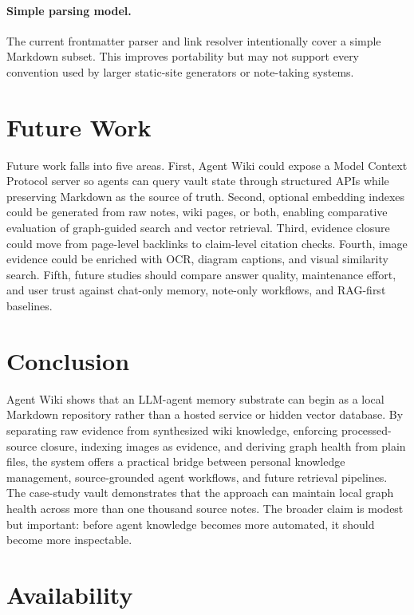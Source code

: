 \documentclass[11pt]{article}
\begin{document}
\paragraph{Simple parsing model.}
The current frontmatter parser and link resolver intentionally cover a simple
Markdown subset. This improves portability but may not support every convention
used by larger static-site generators or note-taking systems.

\section{Future Work}

Future work falls into five areas. First, Agent Wiki could expose a Model
Context Protocol server so agents can query vault state through structured APIs
while preserving Markdown as the source of truth. Second, optional embedding
indexes could be generated from raw notes, wiki pages, or both, enabling
comparative evaluation of graph-guided search and vector retrieval. Third,
evidence closure could move from page-level backlinks to claim-level citation
checks. Fourth, image evidence could be enriched with OCR, diagram captions, and
visual similarity search. Fifth, future studies should compare answer quality,
maintenance effort, and user trust against chat-only memory, note-only
workflows, and RAG-first baselines.

\section{Conclusion}

Agent Wiki shows that an LLM-agent memory substrate can begin as a local
Markdown repository rather than a hosted service or hidden vector database. By
separating raw evidence from synthesized wiki knowledge, enforcing processed-
source closure, indexing images as evidence, and deriving graph health from
plain files, the system offers a practical bridge between personal knowledge
management, source-grounded agent workflows, and future retrieval pipelines.
The case-study vault demonstrates that the approach can maintain local graph
health across more than one thousand source notes. The broader claim is modest
but important: before agent knowledge becomes more automated, it should become
more inspectable.

\section*{Availability}
\end{document}

